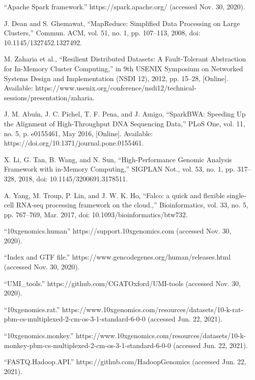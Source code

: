 \documentclass[10pt,journal,compsoc]{IEEEtran}
\begin{document}
\begin{thebibliography}{1}
“Apache Spark framework.” https://spark.apache.org/ (accessed Nov. 30, 2020).

J. Dean and S. Ghemawat, “MapReduce: Simplified Data Processing on Large Clusters,” Commun. ACM, vol. 51, no. 1, pp. 107–113, 2008, doi: 10.1145/1327452.1327492.

M. Zaharia et al., “Resilient Distributed Datasets: A Fault-Tolerant Abstraction for In-Memory Cluster Computing,” in 9th {USENIX} Symposium on Networked Systems Design and Implementation ({NSDI} 12), 2012, pp. 15–28, [Online]. Available: https://www.usenix.org/conference/nsdi12/technical-sessions/presentation/zaharia.

J. M. Abuín, J. C. Pichel, T. F. Pena, and J. Amigo, “SparkBWA: Speeding Up the Alignment of High-Throughput DNA Sequencing Data,” PLoS One, vol. 11, no. 5, p. e0155461, May 2016, [Online]. Available: https://doi.org/10.1371/journal.pone.0155461.

X. Li, G. Tan, B. Wang, and N. Sun, “High-Performance Genomic Analysis Framework with in-Memory Computing,” SIGPLAN Not., vol. 53, no. 1, pp. 317–328, 2018, doi: 10.1145/3200691.3178511.

A. Yang, M. Troup, P. Lin, and J. W. K. Ho, “Falco: a quick and flexible single-cell RNA-seq processing framework on the cloud.,” Bioinformatics, vol. 33, no. 5, pp. 767–769, Mar. 2017, doi: 10.1093/bioinformatics/btw732.

“10xgenomics.human” https://support.10xgenomics.com (accessed Nov. 30, 2020).

“Index and GTF file.” https://www.gencodegenes.org/human/releases.html (accessed Nov. 30, 2020).

“UMI\_tools.” https://github.com/CGATOxford/UMI-tools (accessed Nov. 30, 2020).

“10xgenomics.rat.” https://www.10xgenomics.com/resources/datasets/10-k-rat-pbm-cs-multiplexed-2-cm-os-3-1-standard-6-0-0 (accessed Jun. 22, 2021).

“10xgenomics.monkey.” https://www.10xgenomics.com/resources/datasets/10-k-monkey-pbm-cs-multiplexed-2-cm-os-3-1-standard-6-0-0 (accessed Jun. 22, 2021).

“FASTQ.Hadoop.API.” https://github.com/HadoopGenomics (accessed Jun. 22, 2021).

\end{thebibliography}
\end{document}
